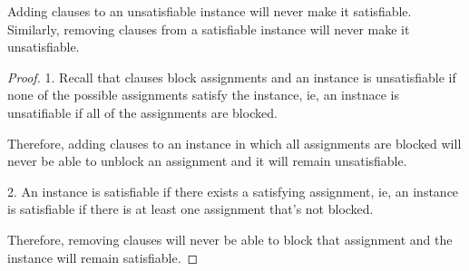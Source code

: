 \documentclass[manuscript]{acmart}
\begin{document}
    \begin{lemma}
        Adding clauses to an unsatisfiable instance will never make it satisfiable.
        Similarly, removing clauses from a satisfiable instance will never make it unsatisfiable.
    \end{lemma}
    \begin{proof}
        1. Recall that clauses block assignments and an instance is unsatisfiable if
        none of the possible assignments satisfy the instance, ie, an instnace is 
        unsatifiable if all of the assignments are blocked.

        Therefore, adding clauses to an instance in which all assignments are blocked
        will never be able to unblock an assignment and it will remain unsatisfiable.

        2. An instance is satisfiable if there exists a satisfying assignment, ie, 
        an instance is satisfiable if there is at least one assignment that's not blocked.

        Therefore, removing clauses will never be able to block that assignment and
        the instance will remain satisfiable.
    \end{proof}
\end{document}
